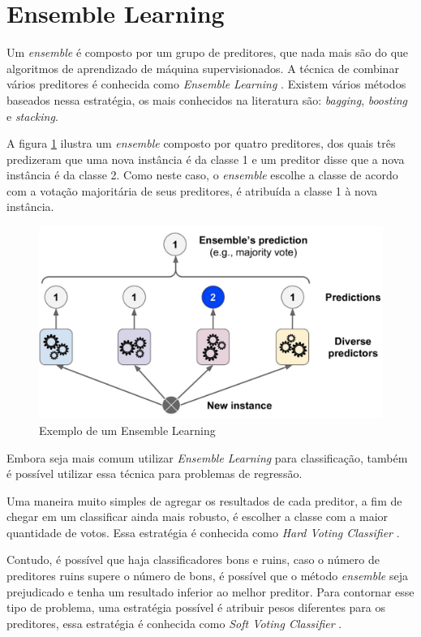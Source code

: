 \section{Ensemble Learning}
\label{sec:ensemble}
Um \textit{ensemble} é composto por um grupo de preditores, que nada mais são do que algoritmos de aprendizado de máquina supervisionados. A técnica de combinar vários preditores é conhecida como \textit{Ensemble Learning} \cite{Geron:2017}. Existem vários métodos baseados nessa estratégia, os mais conhecidos na literatura são: \textit{bagging}, \textit{boosting} e \textit{stacking}.

A figura \ref{fig:ensemble} ilustra um \textit{ensemble} composto por quatro preditores, dos quais três predizeram que uma nova instância é da classe 1 e um preditor disse que a nova instância é da classe 2. Como neste caso, o \textit{ensemble} escolhe a classe de acordo com a votação majoritária de seus preditores, é atribuída a classe 1 à nova instância.

\begin{figure}[ht!]
    \centering
    \includegraphics[scale=0.2]{Imagens/ensemble.png}
    \caption{Exemplo de um Ensemble Learning \cite{Geron:2017}}
    \label{fig:ensemble}
\end{figure}

Embora seja mais comum utilizar \textit{Ensemble Learning} para classificação, também é possível utilizar essa técnica para problemas de regressão.

Uma maneira muito simples de agregar os resultados de cada preditor, a fim de chegar em um classificar ainda mais robusto, é escolher a classe com a maior quantidade de votos. Essa estratégia é conhecida como \textit{Hard Voting Classifier} \cite{Geron:2017}.

Contudo, é possível que haja classificadores bons e ruins, caso o número de preditores ruins supere o número de bons, é possível que o método \textit{ensemble} seja prejudicado e tenha um resultado inferior ao melhor preditor. Para contornar esse tipo de problema, uma estratégia possível é atribuir pesos diferentes para os preditores, essa estratégia é conhecida como \textit{Soft Voting Classifier} \cite{Geron:2017}.


